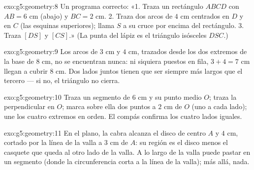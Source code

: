 \begin{solution}{exo:g5:geometry:8}
Un programa correcto: «1. Traza un rectángulo $ABCD$ con $AB = 6$ cm
(abajo) y $BC = 2$ cm. 2. Traza dos arcos de  $4$ cm centrados
en $D$ y en $C$ (las esquinas superiores); llama $S$ a su cruce por encima
del rectángulo. 3. Traza $[DS]$ y $[CS]$.» (La punta del lápiz
es el triángulo isósceles $DSC$.)
\end{solution}

\begin{solution}{exo:g5:geometry:9}
Los arcos de  $3$ cm y $4$ cm, trazados desde los dos extremos de la
base de $8$ cm, no se encuentran nunca: ni siquiera puestos en fila, $3 + 4 = 7$ cm
llegan a cubrir $8$ cm. Dos lados juntos tienen que ser siempre más largos que
el tercero --- si no, el triángulo no cierra.
\end{solution}

\begin{solution}{exo:g5:geometry:10}
Traza un segmento de $6$ cm y su punto medio $O$; traza la
perpendicular en $O$; marca sobre ella dos puntos a $2$ cm de $O$ (uno
a cada lado); une los cuatro extremos en orden. El compás
confirma los cuatro lados iguales.
\end{solution}

\begin{solution}{exo:g5:geometry:11}
En el plano, la cabra alcanza el disco de centro $A$ y 
$4$ cm, cortado por la línea de la valla a $3$ cm de $A$: su región es
el disco menos el casquete que queda al otro lado de la valla. A lo largo de la valla puede
pastar en un segmento (donde la circunferencia corta a la línea de la valla);
más allá, nada.
\end{solution}
